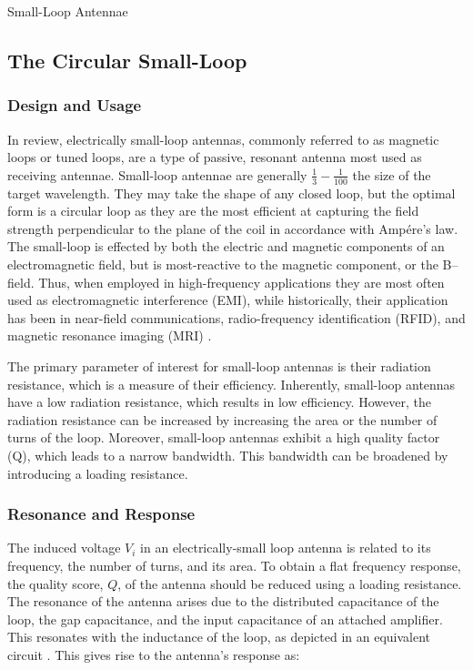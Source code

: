 \documentclass[12pt]{article}
\begin{document}
\begin{section} {Small-Loop Antennae}

\subsection{The Circular Small-Loop}

\subsubsection{Design and Usage}

In review, electrically small-loop antennas, commonly referred to as magnetic loops or tuned loops, are a type of passive, resonant antenna most used as receiving antennae. Small-loop antennae are generally $ \frac{1}{3} - \frac{1}{100} $ the size of the target wavelength. They may take the shape of any closed loop, but the optimal form is a circular loop as they are the most efficient at capturing the field strength perpendicular to the plane of the coil in accordance with Ampére's law. The small-loop is effected by both the electric and magnetic components of an electromagnetic field, but is most-reactive to the magnetic component, or the B–field. Thus, when employed in high-frequency applications they are most often used as electromagnetic interference (EMI), while historically, their application has been in near-field communications, radio-frequency identification (RFID), and magnetic resonance imaging (MRI) \cite{kanda_standard_1993}.

The primary parameter of interest for small-loop antennas is their radiation resistance, which is a measure of their efficiency. Inherently, small-loop antennas have a low radiation resistance, which results in low efficiency. However, the radiation resistance can be increased by increasing the area or the number of turns of the loop. Moreover, small-loop antennas exhibit a high quality factor (Q), which leads to a narrow bandwidth. This bandwidth can be broadened by introducing a loading resistance.

\subsubsection{Resonance and Response}

The induced voltage \(V_i\) in an electrically-small loop antenna is related to its frequency, the number of turns, and its area. To obtain a flat frequency response, the quality score, $Q$, of the antenna should be reduced using a loading resistance. The resonance of the antenna arises due to the distributed capacitance of the loop, the gap capacitance, and the input capacitance of an attached amplifier. This resonates with the inductance of the loop, as depicted in an equivalent circuit \cite{kanda_standard_1993}. This gives rise to the antenna's response as:


\end{section}
\end{document}
